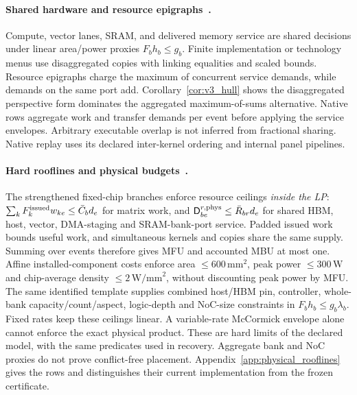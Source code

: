 \paragraph{Shared hardware and resource epigraphs~.}
Compute, vector lanes, SRAM, and delivered memory service are shared decisions under linear area/power proxies $F_bh_b\le g_b$.
Finite implementation or technology menus use disaggregated copies with linking equalities and scaled bounds.
Resource epigraphs charge the maximum of concurrent service demands, while demands on the same port add.
Corollary~\ref{cor:v3_hull} shows the disaggregated perspective form dominates the aggregated maximum-of-sums alternative.
Native rows aggregate work and transfer demands per event before applying the service envelopes.
Arbitrary executable overlap is not inferred from fractional sharing.
Native replay uses its declared inter-kernel ordering and internal panel pipelines.
\label{eq:v3_caps}\label{eq:v3_epigraph}

\paragraph{Hard rooflines and physical budgets~.}
The strengthened fixed-chip branches enforce resource ceilings \emph{inside the LP}: $\sum_k F_k^{\rm issued}w_{ke}\le\bar C_b d_e$ for matrix work, and $\mathsf D^{r,\rm phys}_{be}\le\bar R_{br}d_e$ for shared HBM, host, vector, DMA-staging and SRAM-bank-port service.
Padded issued work bounds useful work, and simultaneous kernels and copies share the same supply.
Summing over events therefore gives MFU and accounted MBU at most one.
Affine installed-component costs enforce area $\le600\,\mathrm{mm}^2$, peak power $\le300\,\mathrm W$ and chip-average density $\le2\,\mathrm{W/mm}^2$, without discounting peak power by MFU.
The same identified template supplies combined host/HBM pin, controller, whole-bank capacity/count/aspect, logic-depth and NoC-size constraints in $F_bh_b\le g_b\lambda_b$.
Fixed rates keep these ceilings linear.
A variable-rate McCormick envelope alone cannot enforce the exact physical product.
These are hard limits of the declared model, with the same predicates used in recovery.
Aggregate bank and NoC proxies do not prove conflict-free placement.
Appendix~\ref{app:physical_rooflines} gives the rows and distinguishes their current implementation from the frozen certificate.


